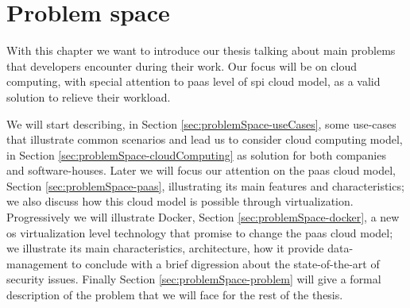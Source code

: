 %
%
\chapter{Problem space}
\label{cap:problemSpace}
With this chapter we want to introduce our thesis talking about main problems that developers
encounter during their work. Our focus will be on cloud computing, with special
attention to \ac{paas} level of \ac{spi} cloud model, as a valid solution to relieve their workload.

We will start describing, in Section \ref{sec:problemSpace-useCases}, some use-cases that illustrate
common scenarios and lead us to consider cloud computing model, in Section 
\ref{sec:problemSpace-cloudComputing} as solution for both companies and software-houses. Later we
will focus our attention on the \ac{paas} cloud model, Section \ref{sec:problemSpace-paas}, 
illustrating its main features and characteristics; we also discuss how this cloud model is possible
through virtualization. Progressively we will illustrate Docker, Section
\ref{sec:problemSpace-docker}, a new \acs{os} virtualization level technology that promise to change
the \ac{paas} cloud model; we illustrate its main characteristics, architecture, how it provide
data-management to conclude with a brief digression about the state-of-the-art of security
issues. Finally Section \ref{sec:problemSpace-problem} will give a formal description of the
problem that we will face for the rest of the thesis.















